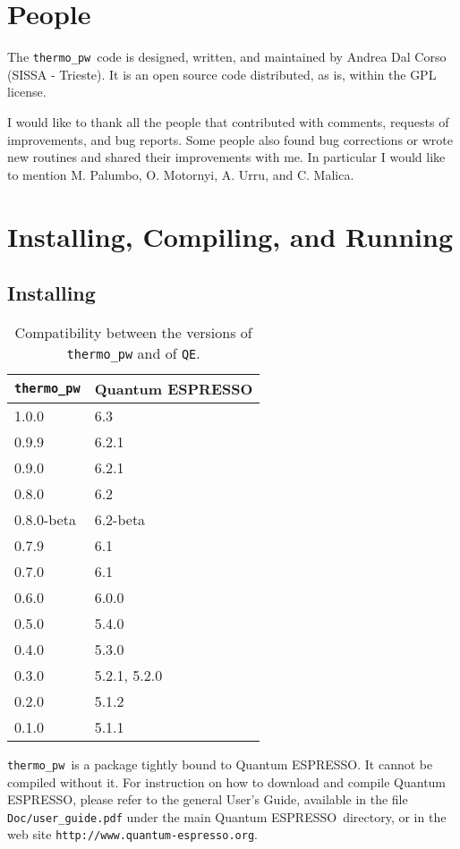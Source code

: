 \documentclass[12pt,a4paper]{article}
\def\qe{{\sc Quantum ESPRESSO}}
\def\thermo{\texttt{thermo\_pw}}
\begin{document}
\newpage
\section{\color{coral}People}
The \thermo\ code is designed, written, and maintained by Andrea Dal Corso 
(SISSA - Trieste). It is an open source code distributed, as is, within the GPL
license.  

I would like to thank all the people that contributed with comments, requests
of improvements, and bug reports. Some people also found bug corrections or
wrote new routines and shared their improvements with me. In particular I would 
like to mention M. Palumbo, O. Motornyi, A. Urru, and C. Malica.

\newpage
\section{\color{coral}Installing, Compiling, and Running}

\subsection{\color{web-blue}Installing}
\begin{table}
\begin{center}
\begin{tabular}{ll}
\hline
\hline
\texttt{thermo\_pw} & \qe  \\
\hline
1.0.0 & 6.3 \\
0.9.9 & 6.2.1 \\
0.9.0 & 6.2.1 \\
0.8.0 & 6.2 \\
0.8.0-beta & 6.2-beta \\
0.7.9 & 6.1 \\
0.7.0 & 6.1 \\
0.6.0 & 6.0.0 \\
0.5.0 & 5.4.0 \\
0.4.0 & 5.3.0 \\
0.3.0 & 5.2.1, 5.2.0 \\
0.2.0 & 5.1.2 \\
0.1.0 & 5.1.1 \\
\hline
\hline
\end{tabular}
\caption{Compatibility between the versions of 
\texttt{thermo\_pw} and of \texttt{QE}.}
\end{center}
\end{table}

\thermo\ is a package tightly bound to \qe. It cannot be compiled without
it. For instruction on how to download and compile \qe, please 
refer to the general User's Guide, available in the file \texttt{Doc/user\_guide.pdf}
under the main \qe\ directory, or in the web site 
\texttt{http://www.quantum-espresso.org}.
\end{document}
